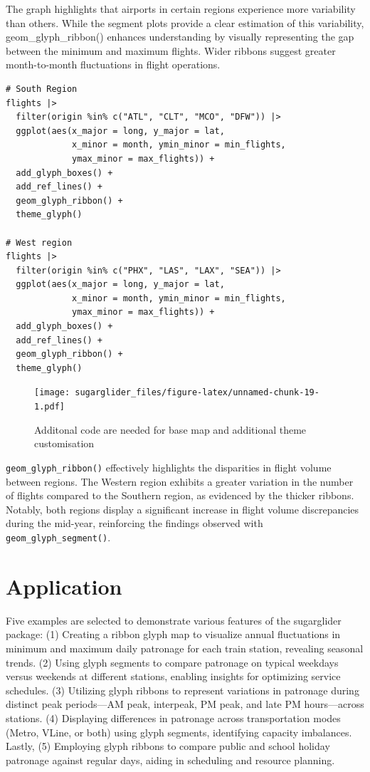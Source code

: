 The graph highlights that airports in certain regions experience more variability than others. While the segment plots provide a clear estimation of this variability, geom\_glyph\_ribbon() enhances understanding by visually representing the gap between the minimum and maximum flights. Wider ribbons suggest greater month-to-month fluctuations in flight operations.

\begin{verbatim}
# South Region
flights |> 
  filter(origin %in% c("ATL", "CLT", "MCO", "DFW")) |>
  ggplot(aes(x_major = long, y_major = lat,
             x_minor = month, ymin_minor = min_flights,
             ymax_minor = max_flights)) + 
  add_glyph_boxes() +
  add_ref_lines() +
  geom_glyph_ribbon() +
  theme_glyph()

# West region
flights |> 
  filter(origin %in% c("PHX", "LAS", "LAX", "SEA")) |>
  ggplot(aes(x_major = long, y_major = lat,
             x_minor = month, ymin_minor = min_flights,
             ymax_minor = max_flights)) + 
  add_glyph_boxes() +
  add_ref_lines() +
  geom_glyph_ribbon() +
  theme_glyph()
\end{verbatim}

\begin{figure}
\centering
\texttt{[image: sugarglider\_files/figure-latex/unnamed-chunk-19-1.pdf]}
\caption{\label{fig:unnamed-chunk-19}Additonal code are needed for base map and additional theme customisation}
\end{figure}

\texttt{geom\_glyph\_ribbon()} effectively highlights the disparities in flight volume between regions. The Western region exhibits a greater variation in the number of flights compared to the Southern region, as evidenced by the thicker ribbons. Notably, both regions display a significant increase in flight volume discrepancies during the mid-year, reinforcing the findings observed with \texttt{geom\_glyph\_segment()}.

\hypertarget{application}{%
\section{Application}\label{application}}

Five examples are selected to demonstrate various features of the sugarglider package: (1) Creating a ribbon glyph map to visualize annual fluctuations in minimum and maximum daily patronage for each train station, revealing seasonal trends. (2) Using glyph segments to compare patronage on typical weekdays versus weekends at different stations, enabling insights for optimizing service schedules. (3) Utilizing glyph ribbons to represent variations in patronage during distinct peak periods---AM peak, interpeak, PM peak, and late PM hours---across stations. (4) Displaying differences in patronage across transportation modes (Metro, VLine, or both) using glyph segments, identifying capacity imbalances. Lastly, (5) Employing glyph ribbons to compare public and school holiday patronage against regular days, aiding in scheduling and resource planning.

